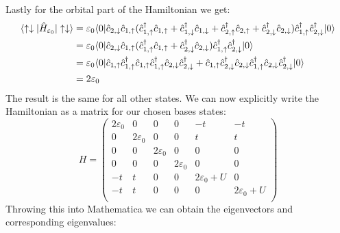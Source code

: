 \documentclass[12pt]{article}
\begin{document}
Lastly for the orbital part of the Hamiltonian we get:
\begin{align}
\langle\uparrow\downarrow|\hat{H}_{\varepsilon_0}|\uparrow\downarrow\rangle&=\varepsilon_0\langle0|\hat{c}_{2,\downarrow}\hat{c}_{1,\uparrow}(\hat{c}_{1,\uparrow}^\dagger\hat{c}_{1,\uparrow}+\hat{c}_{1,\downarrow}^\dagger\hat{c}_{1,\downarrow}+\hat{c}_{2,\uparrow}^\dagger\hat{c}_{2,\uparrow}+\hat{c}_{2,\downarrow}^\dagger\hat{c}_{2,\downarrow})\hat{c}_{1,\uparrow}^\dagger\hat{c}_{2,\downarrow}^\dagger|0\rangle\\
&=\varepsilon_0\langle0|\hat{c}_{2,\downarrow}\hat{c}_{1,\uparrow}(\hat{c}_{1,\uparrow}^\dagger\hat{c}_{1,\uparrow}+\hat{c}_{2,\downarrow}^\dagger\hat{c}_{2,\downarrow})\hat{c}_{1,\uparrow}^\dagger\hat{c}_{2,\downarrow}^\dagger|0\rangle\notag\\
&=\varepsilon_0\langle0|\hat{c}_{1,\uparrow}\hat{c}_{1,\uparrow}^\dagger\hat{c}_{1,\uparrow}\hat{c}_{1,\uparrow}^\dagger\hat{c}_{2,\downarrow}\hat{c}_{2,\downarrow}^\dagger+\hat{c}_{1,\uparrow}\hat{c}_{2,\downarrow}^\dagger\hat{c}_{2,\downarrow}\hat{c}_{1,\uparrow}^\dagger\hat{c}_{2,\downarrow}\hat{c}_{2,\downarrow}^\dagger|0\rangle\notag\\
&=2\varepsilon_0\notag
\end{align}
The result is the same for all other states.
\newpage
\noindent
We can now explicitly write the Hamiltonian as a matrix for our chosen bases states:
\begin{equation}
H=\begin{pmatrix}
2\varepsilon_0 & 0 & 0 & 0 & -t & -t\\
0 & 2\varepsilon_0 & 0 & 0 & t & t\\
0& 0 & 2\varepsilon_0 & 0 & 0 & 0\\
0 & 0& 0 & 2\varepsilon_0 & 0 & 0\\
-t & t & 0& 0 & 2\varepsilon_0 + U & 0\\
-t & t & 0& 0&0 & 2\varepsilon_0+U\\
\end{pmatrix}
\end{equation}
Throwing this into Mathematica we can obtain the eigenvectors and corresponding eigenvalues:
\end{document}
